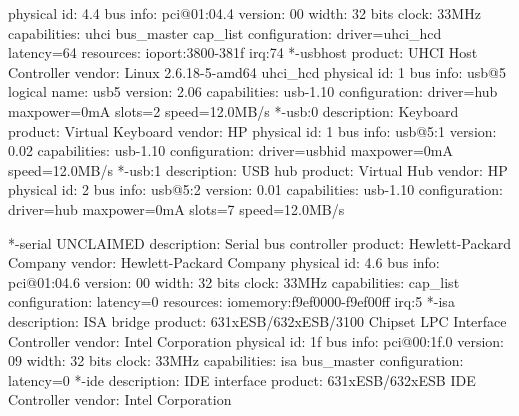 \documentclass[mingoth,a4paper]{jsarticle}
\begin{document}
{{{{{{\begin{commandline}
                physical id: 4.4
                bus info: pci@01:04.4
                version: 00
                width: 32 bits
                clock: 33MHz
                capabilities: uhci bus_master cap_list
                configuration: driver=uhci_hcd latency=64
                resources: ioport:3800-381f irq:74
              *-usbhost
                   product: UHCI Host Controller
                   vendor: Linux 2.6.18-5-amd64 uhci_hcd
                   physical id: 1
                   bus info: usb@5
                   logical name: usb5
                   version: 2.06
                   capabilities: usb-1.10
                   configuration: driver=hub maxpower=0mA slots=2 speed=12.0MB/s
                 *-usb:0
                      description: Keyboard
                      product: Virtual Keyboard
                      vendor: HP
                      physical id: 1
                      bus info: usb@5:1
                      version: 0.02
                      capabilities: usb-1.10
                      configuration: driver=usbhid maxpower=0mA speed=12.0MB/s
                 *-usb:1
                      description: USB hub
                      product: Virtual Hub
                      vendor: HP
                      physical id: 2
                      bus info: usb@5:2
                      version: 0.01
                      capabilities: usb-1.10
                      configuration: driver=hub maxpower=0mA slots=7 speed=12.0MB/s
\end{commandline}
\begin{commandline}
           *-serial UNCLAIMED
                description: Serial bus controller
                product: Hewlett-Packard Company
                vendor: Hewlett-Packard Company
                physical id: 4.6
                bus info: pci@01:04.6
                version: 00
                width: 32 bits
                clock: 33MHz
                capabilities: cap_list
                configuration: latency=0
                resources: iomemory:f9ef0000-f9ef00ff irq:5
        *-isa
             description: ISA bridge
             product: 631xESB/632xESB/3100 Chipset LPC Interface Controller
             vendor: Intel Corporation
             physical id: 1f
             bus info: pci@00:1f.0
             version: 09
             width: 32 bits
             clock: 33MHz
             capabilities: isa bus_master
             configuration: latency=0
        *-ide
             description: IDE interface
             product: 631xESB/632xESB IDE Controller
             vendor: Intel Corporation

\end{commandline}}}}}}}
\end{document}
